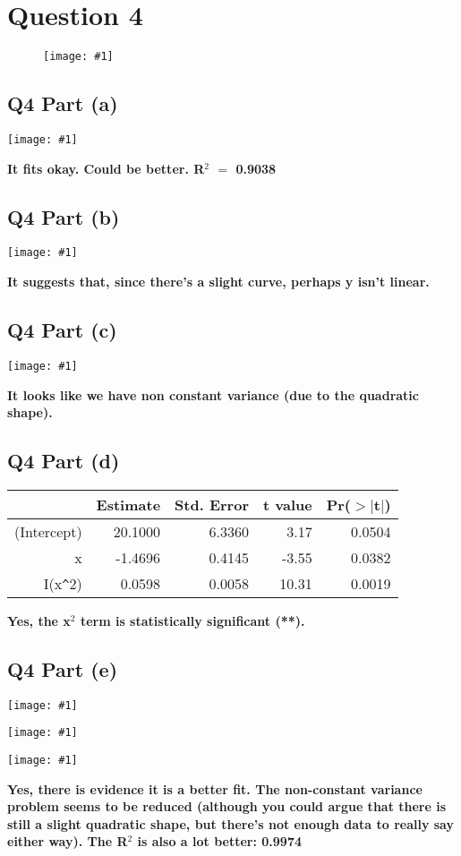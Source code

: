 \documentclass{article}
\newcommand{\mt}[1]{\ensuremath{#1}}
\newcommand\bsc[2][\DefaultOpt]{%
  \def\DefaultOpt{#2}%
  \section[#1]{#2}%
}
\newcommand\ssc[2][\DefaultOpt]{%
  \def\DefaultOpt{#2}%
  \subsection[#1]{#2}%
}
\newcommand{\eql}{ \mt{\operatorname{=}} }
\newcommand{\simg}[1]{
  \texttt{[image: \#1]}
}
\newcommand{\wimg}[1]{
\begin{figure}[h]
  \texttt{[image: \#1]}
\end{figure}
}
\begin{document}
\bsc{Question 4}{
\wimg{HW6Q4}

\ssc{Q4 Part (a)}{

\simg{HW6Q4LM}

\textbf{It fits okay. Could be better. R$^2$ \eql 0.9038}

}
\ssc{Q4 Part (b)}{

\simg{HW6Q4PB}

\textbf{It suggests that, since there's a slight curve, perhaps y isn't linear.}

}
\ssc{Q4 Part (c)}{

\simg{HW6Q4PC}

\textbf{It looks like we have non constant variance (due to the quadratic shape).}
}
\ssc{Q4 Part (d)}{

\begin{table}[ht]
\centering
\begin{tabular}{rrrrr}
  \hline
 & Estimate & Std. Error & t value & Pr($>$$|$t$|$) \\ 
  \hline
(Intercept) & 20.1000 & 6.3360 & 3.17 & 0.0504 \\ 
  x & -1.4696 & 0.4145 & -3.55 & 0.0382 \\ 
  I(x\verb|^|2) & 0.0598 & 0.0058 & 10.31 & 0.0019 \\ 
   \hline
\end{tabular}
\end{table}

\textbf{Yes, the x$^2$ term is statistically significant (**).}

}
\ssc{Q4 Part (e)}{

\simg{HW6Q4PE1}
\simg{HW6Q4PE2}
\simg{HW6Q4PE3}

\textbf{Yes, there is evidence it is a better fit. The non-constant variance problem seems to be reduced (although you could argue that there is still a slight quadratic shape, but there's not enough data to really say either way). The R$^2$ is also a lot better: 0.9974} 

}
}

\newpage
\end{document}
